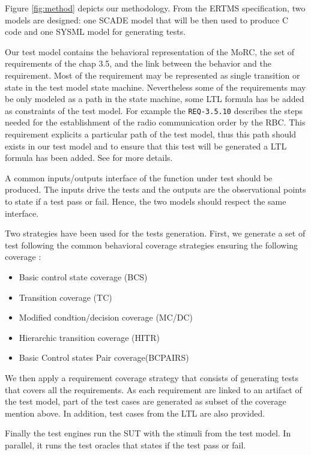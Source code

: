 \documentclass{article}
\begin{document}
Figure \ref{fig:method} depicts our methodology. From the ERTMS
specification, two models are designed: one SCADE model that will
be then  used to produce C code and one SYSML model for generating
tests.

Our test model contains the behavioral representation of the MoRC,
the set of requirements of the chap 3.5, and the link between the
behavior and the requirement.  Most of the requirement may be
represented as single transition or state in the test model state
machine. Nevertheless some of the requirements  may be only modeled as a path in the
state machine, some LTL formula has be added as constraints of the
test model. 
For example the \verb+REQ-3.5.10+ describes the steps needed for the
establishment of the radio communication order by the RBC. This
requirement explicits a particular path of the test model, thus this
path should exists in our test model and to ensure that this test will
be generated a LTL formula has been added.
See \cite{braunstein_MorC_2013} for more details.

A common inputs/outputs interface of the function under test should be
produced. The inputs drive the tests and the outputs are the
observational points to state if a test pass or fail. Hence, the two
models should respect the same interface.

Two strategies have been used for the tests generation. First, we
generate a set of test following the common behavioral coverage
strategies ensuring the following coverage :
\begin{itemize}
\item  Basic control state coverage (BCS)
\item  Transition coverage (TC)
\item  Modified condtion/decision coverage (MC/DC)
\item  Hierarchic transition coverage (HITR)
\item  Basic Control states Pair coverage(BCPAIRS)
\end{itemize}
We then apply a requirement coverage strategy that consists of
generating tests that covers all the requirements. As each requirement
are linked to an artifact of the test model, part of the test cases
are generated as subset of the coverage mention above. In addition,
test cases from the LTL are also provided.


Finally the test engines run the SUT with the stimuli from the test
model. In parallel, it runs the test oracles that states if the test
pass or fail.
\end{document}
